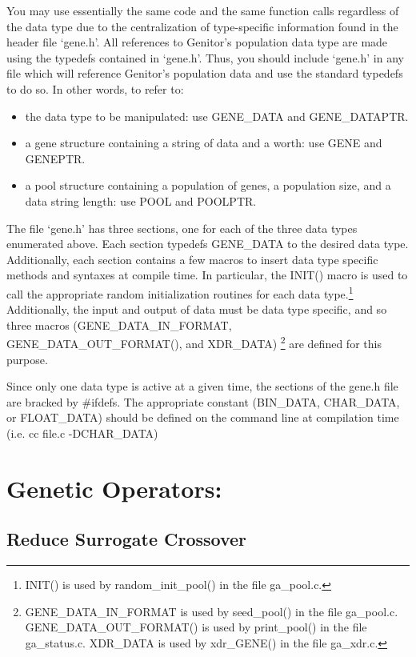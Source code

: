 You may use essentially the same code and the same function calls 
regardless of the data type due to the centralization of type-specific
information found in the header file `gene.h'.  All references to
Genitor's population data type are made using the typedefs contained
in `gene.h'.  Thus, you should include `gene.h' in any file which 
will reference Genitor's population data and use the standard
typedefs to do so.  In other words, to refer to:
\begin{itemize}
 \item the data type to be manipulated: use GENE\_DATA and GENE\_DATAPTR.
 \item a gene structure containing a string of data and a worth:
	   use GENE and GENEPTR.
 \item a pool structure containing a population of genes, a population
	   size, and a data string length: use POOL and POOLPTR.
\end{itemize}

The file `gene.h' has three sections, one for each of the three data
types enumerated above.  Each section typedefs GENE\_DATA to the
desired data type.  Additionally, each section contains a few macros
to insert data type specific methods and syntaxes at compile time.
In particular, the INIT() macro is used to call the appropriate random
initialization routines for each data type.\footnote{ INIT() is used
by random\_init\_pool() in the file ga\_pool.c.}  Additionally, the
input and output of data must be data type specific, and so three macros
(GENE\_DATA\_IN\_FORMAT, GENE\_DATA\_OUT\_FORMAT(), and XDR\_DATA)
\footnote{GENE\_DATA\_IN\_FORMAT is used by seed\_pool() in the file
ga\_pool.c.  GENE\_DATA\_OUT\_FORMAT() is used by print\_pool() in the
file ga\_status.c. XDR\_DATA is used by xdr\_GENE() in the file ga\_xdr.c.}
are defined for this purpose.

Since only one data type is active at a given time, the sections of
the gene.h file are bracked by \#ifdefs.  The appropriate constant
(BIN\_DATA, CHAR\_DATA, or FLOAT\_DATA) should be defined on the 
command line at compilation time (i.e. cc file.c -DCHAR\_DATA)

\newpage

\section{Genetic Operators:}

\subsection{Reduce Surrogate Crossover}

